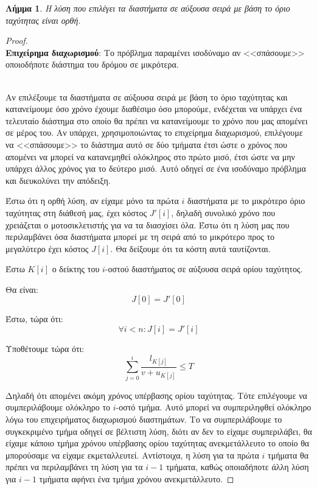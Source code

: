 \documentclass[11pt,a4paper]{book}
\newtheorem*{lemma}{Λήμμα}
\begin{document}
\begin{lemma}
Η λύση που επιλέγει τα διαστήματα σε αύξουσα σειρά με βάση το όριο ταχύτητας είναι ορθή.
\end{lemma}
\begin{proof}

\hspace*{\fill} \\

{\bf Επιχείρημα διαχωρισμού}: Το πρόβλημα παραμένει ισοδύναμο αν <<σπάσουμε>> οποιοδήποτε διάστημα του δρόμου σε μικρότερα.

\hspace*{\fill} \\

Αν επιλέξουμε τα διαστήματα σε αύξουσα σειρά με βάση το όριο ταχύτητας και κατανείμουμε όσο χρόνο έχουμε διαθέσιμο όσο μπορούμε, ενδέχεται να υπάρχει ένα τελευταίο διάστημα στο οποίο θα πρέπει να κατανείμουμε το χρόνο που μας απομένει σε μέρος του. Αν υπάρχει, χρησιμοποιώντας το επιχείρημα διαχωρισμού, επιλέγουμε να <<σπάσουμε>> το διάστημα αυτό σε δύο τμήματα έτσι ώστε ο χρόνος που απομένει να μπορεί να κατανεμηθεί ολόκληρος στο πρώτο μισό, έτσι ώστε να μην υπάρχει άλλος χρόνος για το δεύτερο μισό. Αυτό οδηγεί σε ένα ισοδύναμο πρόβλημα και διευκολύνει την απόδειξη.

Έστω ότι η ορθή λύση, αν είχαμε μόνο τα πρώτα $i$ διαστήματα με το μικρότερο όριο ταχύτητας στη διάθεσή μας, έχει κόστος $J'[ i ]$, δηλαδή συνολικό χρόνο που χρειάζεται ο μοτοσικλετιστής για να τα διασχίσει όλα. Έστω ότι η λύση μας που περιλαμβάνει όσα διαστήματα μπορεί με τη σειρά από το μικρότερο προς το μεγαλύτερο έχει κόστος $J[ i ]$. Θα δείξουμε ότι τα κόστη αυτά ταυτίζονται.

Έστω $K[ i ]$ ο δείκτης του $i$-οστού διαστήματος σε αύξουσα σειρά ορίου ταχύτητος.

Θα είναι:
\[
J[ 0 ] = J'[ 0 ]
\]

Έστω, τώρα ότι:
\[
\forall i < n: J[ i ] = J'[ i ]
\]

Υποθέτουμε τώρα ότι:
\[
\sum_{j=0}^i \frac{l_{K[ j ]}}{v + u_{K[ j ]}} \leq T
\]

Δηλαδή ότι απομένει ακόμη χρόνος υπέρβασης ορίου ταχύτητας. Τότε επιλέγουμε να συμπεριλάβουμε ολόκληρο το $i$-οστό τμήμα. Αυτό μπορεί να συμπεριληφθεί ολόκληρο λόγω του επιχειρήματος διαχωρισμού διαστημάτων. Το να συμπεριλάβουμε το συγκεκριμένο τμήμα οδηγεί σε βέλτιστη λύση, διότι αν δεν το είχαμε συμπεριλάβει, θα είχαμε κάποιο τμήμα χρόνου υπέρβασης ορίου ταχύτητας ανεκμετάλλευτο το οποίο θα μπορούσαμε να είχαμε εκμεταλλευτεί. Αντίστοιχα, η λύση για τα πρώτα $i$ τμήματα θα πρέπει να περιλαμβάνει τη λύση για τα $i - 1$ τμήματα, καθώς οποιαδήποτε άλλη λύση για $i - 1$ τμήματα αφήνει ένα τμήμα χρόνου ανεκμετάλλευτο.


\end{proof}
\end{document}

